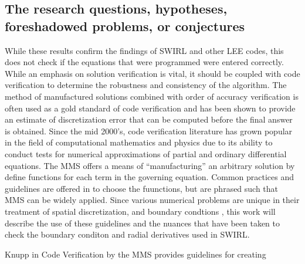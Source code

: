 \subsection{The research questions, hypotheses, foreshadowed problems, or 
    conjectures}
While these results confirm the findings of SWIRL and other LEE codes, this does not check if the 
equations that were programmed were entered correctly. While an emphasis on 
solution verification is vital, it should be coupled with code verification to
determine the robustness and consistency of the algorithm.  The method of manufactured
solutions combined with order of accuracy verification is often used as a 
gold standard of code verification \cite{Roy2005} and has been shown to provide
an estimate of discretization error that can be computed before the final answer
is obtained. Since the mid 2000's, code verification literature has grown popular
in the field of computational mathematics and physics due to its ability to
conduct tests for numerical approximations of partial and ordinary differential 
equations. The MMS offers a means of ``manufacturing'' an arbitrary solution by
define functions for each term in the governing equation.  Common practices 
and guidelines are offered in \cite{Salari2000} to choose the fuunctions, but
are phrased such that MMS can be widely applied. Since various numerical problems
are unique in their treatment of spatial discretization, and boundary condtions ,
this work will describe the use of these guidelines and the nuances that have
been taken to check the boundary conditon and radial derivatives used in SWIRL.

Knupp in Code Verification by the MMS \cite{Salari2000} provides guidelines for creating
